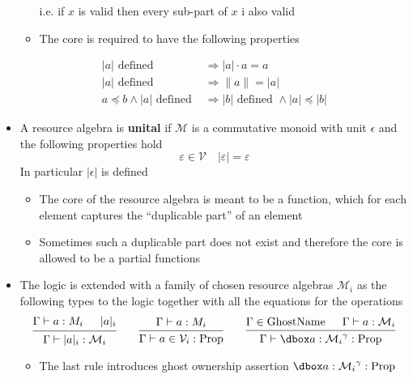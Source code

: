 \begin{itemize}
\begin{itemize}
\[    \]
    i.e. if $x$ is valid then every sub-part of $x$ i also valid
  	\item The core is required to have the following properties
  \end{itemize}
  \[
    \begin{aligned}
      |a| \text { defined } & \Rightarrow|a| \cdot a=a \\
      |a| \text { defined } &\Rightarrow\|a\|=|a| \\ 
      a \preccurlyeq b \wedge|a| \text { defined } &\Rightarrow|b| \text { defined } \wedge|a| \preccurlyeq|b| \end{aligned}
  \]
  \item A resource algebra is \textbf{unital} if $\mathcal M$ is a commutative monoid with unit $\epsilon$ and the following properties hold
  \[
    \varepsilon \in \mathcal{V} \quad|\varepsilon|=\varepsilon
  \]
  In particular $|\epsilon|$ is defined
  \begin{itemize}
    \item The core of the resource algebra is meant to be a function, which for each element captures the ``duplicable part'' of an element
  	\item Sometimes such a duplicable part does not exist and therefore the core is allowed to be a partial functions
  \end{itemize}
  \item The logic is extended with a family of chosen resource algebras $\mathcal M_i$ as the following types to the logic together with all the equations for the operations
  \[
  \begin{prooftree} 
    \hypo{\Gamma \vdash a: M_i}  
    \hypo{|a|_i} \text{ defined}
    \infer2{\Gamma \vdash |a|_i : \mathcal M_i}
  \end{prooftree}
  \qquad 
  \begin{prooftree} 
    \hypo{\Gamma \vdash a: M_i}
    \infer1{\Gamma \vdash a \in \mathcal V_i : \text{Prop}}
  \end{prooftree}
  \qquad
  \begin{prooftree} 
    \hypo{\Gamma \in \text{GhostName}}
    \hypo{\Gamma \vdash a : \mathcal M_i}
    \infer2{\Gamma \vdash \dboxed{a: \mathcal M_i}^\gamma : \text{Prop}}
  \end{prooftree}
  \]
  \begin{itemize}
  	\item The last rule introduces ghost ownership assertion $\dboxed{a: \mathcal M_i}^\gamma : \text{Prop}$
    \begin{itemize}

\end{itemize}
\end{itemize}
\end{itemize}
